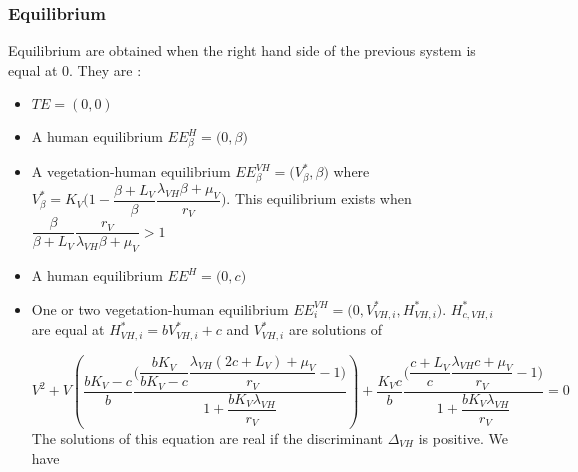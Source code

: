 \documentclass{article}
\newcommand{\lv}{\lambda_{VH}}
\begin{document}
\subsubsection{Equilibrium}
Equilibrium are obtained when the right hand side of the previous system is equal at 0. They are :
\begin{itemize}
\item $TE = (0,0)$
\item A human equilibrium $EE^H_\beta = \Big(0,\beta \Big)$
\item A vegetation-human equilibrium $EE^{VH}_\beta = \Big(V^*_{\beta}, \beta \Big)$ where $V^*_\beta = K_V \Big(1- \dfrac{\beta + L_V}{\beta} \dfrac{\lv \beta + \mu_V}{r_V} \Big)$. This equilibrium exists when $\dfrac{\beta}{\beta + L_V} \dfrac{r_V}{\lv \beta + \mu_V} > 1$
\item A human equilibrium $EE^H = \Big(0,c\Big)$
\item One or two vegetation-human equilibrium $EE^{VH}_i = \Big(0, V^*_{VH,i}, H^*_{VH,i} \Big)$. $H^*_{c, VH,i}$ are equal at $H^*_{VH, i} = bV^*_{VH, i} + c$ and $V^*_{VH,i}$ are solutions of
%
%

\begin{equation}
V^2 + V \left(\dfrac{bK_V-c}{b} \dfrac{\Big( \dfrac{bK_V}{bK_V-c}\dfrac{\lv(2c+L_V) + \mu_V}{r_V} - 1\Big)}{1 + \dfrac{b K_V \lv}{r_V}}  \right) + \dfrac{K_Vc}{b} \dfrac{\Big(\dfrac{c+L_V}{c} \dfrac{\lv c + \mu_V}{r_V} - 1\Big)}{1 + \dfrac{b K_V \lv}{r_V}} = 0
\label{equilibreVH:equationV}
\end{equation}
The solutions of this equation are real if the discriminant $\Delta_{VH}$ is positive. We have


\end{itemize}
\end{document}
